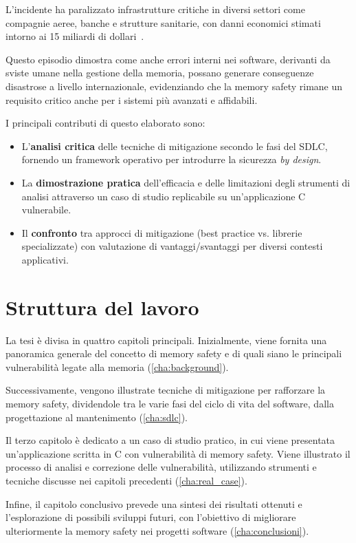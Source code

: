 L'incidente ha paralizzato infrastrutture critiche in diversi settori come
compagnie aeree, banche e strutture sanitarie, con danni economici stimati
intorno ai 15 miliardi di dollari~\cite{crowdstrike_bug_wired_cost}.

Questo episodio dimostra come anche errori interni nei software, derivanti da
sviste umane nella gestione della memoria, possano generare conseguenze disastrose
a livello internazionale, evidenziando che la memory safety rimane un requisito
critico anche per i sistemi più avanzati e affidabili.

\bigskip
\noindent
I principali contributi di questo elaborato sono:
\begin{itemize}
  \item L'\textbf{analisi critica} delle tecniche di mitigazione secondo le fasi
    del SDLC, fornendo un framework operativo per introdurre la sicurezza \textit{by
    design}.

  \item La \textbf{dimostrazione pratica} dell'efficacia e delle limitazioni
    degli strumenti di analisi attraverso un caso di studio replicabile su un'applicazione
    C vulnerabile.

  \item Il \textbf{confronto} tra approcci di mitigazione (best practice vs.
    librerie specializzate) con valutazione di vantaggi/svantaggi per diversi contesti
    applicativi.
\end{itemize}

\section*{Struttura del lavoro}
\label{sec:structure} La tesi è divisa in quattro capitoli principali. Inizialmente,
viene fornita una panoramica generale del concetto di memory safety e di quali
siano le principali vulnerabilità legate alla memoria (\autoref{cha:background}).

Successivamente, vengono illustrate tecniche di mitigazione per rafforzare la memory
safety, dividendole tra le varie fasi del ciclo di vita del software, dalla progettazione
al mantenimento (\autoref{cha:sdlc}).

Il terzo capitolo è dedicato a un caso di studio pratico, in cui viene
presentata un'applicazione scritta in C con vulnerabilità di memory safety. Viene
illustrato il processo di analisi e correzione delle vulnerabilità, utilizzando
strumenti e tecniche discusse nei capitoli precedenti (\autoref{cha:real_case}).

Infine, il capitolo conclusivo prevede una sintesi dei risultati ottenuti e l'esplorazione
di possibili sviluppi futuri, con l'obiettivo di migliorare ulteriormente la
memory safety nei progetti software (\autoref{cha:conclusioni}).